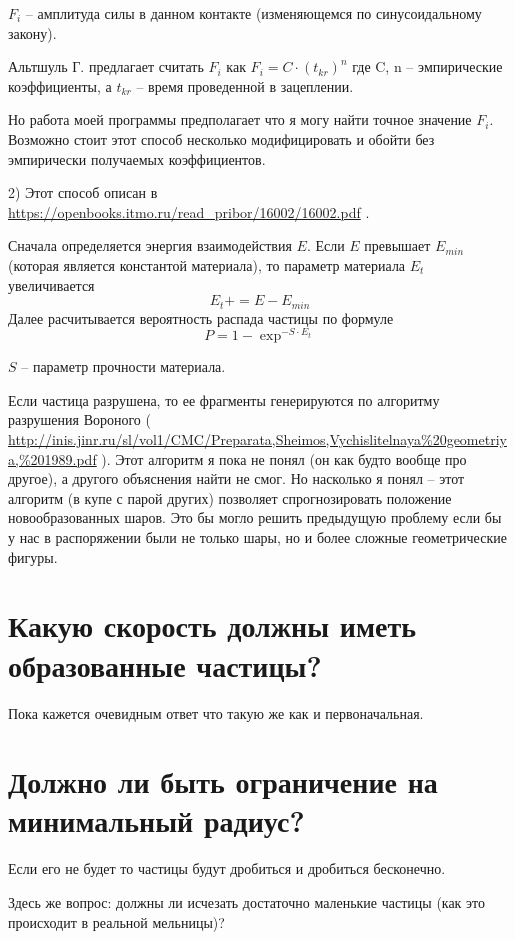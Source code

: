 \documentclass[a4paper]{article}
\begin{document}
$F_i$ -- амплитуда силы в данном контакте (изменяющемся по синусоидальному закону).

Альтшуль Г. предлагает считать $F_i$ как $F_i = C \cdot (t_{kr})^n$ где C, n -- эмпирические коэффициенты, а $t_{kr}$ -- время проведенной в зацеплении.

Но работа моей программы предполагает что я могу найти точное значение $F_i$.
Возможно стоит этот способ несколько модифицировать и обойти без эмпирически получаемых коэффициентов.

2) 
Этот способ описан в \url{https://openbooks.itmo.ru/read_pribor/16002/16002.pdf} .

Сначала определяется энергия взаимодействия $E$.
Если $E$ превышает $E_{min}$ (которая является константой материала), то параметр материала $E_t$ увеличивается
\[
E_t += E - E_{min}
\]
Далее расчитывается вероятность распада частицы по формуле 
\[
P = 1 - \exp^{-S \cdot E_t}
\]

$S$ -- параметр прочности материала.

Если частица разрушена, то ее фрагменты генерируются по алгоритму разрушения Вороного ( \url{http://inis.jinr.ru/sl/vol1/CMC/Preparata,Sheimos,Vychislitelnaya\%20geometriya,\%201989.pdf} ).
Этот алгоритм я пока не понял (он как будто вообще про другое), а другого объяснения найти не смог.
Но насколько я понял -- этот алгоритм (в купе с парой других) позволяет спрогнозировать положение новообразованных шаров. Это бы могло решить предыдущую проблему если бы у нас в распоряжении были не только шары, но и более сложные геометрические фигуры.


\section{Какую скорость должны иметь образованные частицы?}

Пока кажется очевидным ответ что такую же как и первоначальная.

\section{Должно ли быть ограничение на минимальный радиус?}

Если его не будет то частицы будут дробиться и дробиться бесконечно.

Здесь же вопрос: должны ли исчезать достаточно маленькие частицы (как это происходит в реальной мельницы)?
\end{document}
